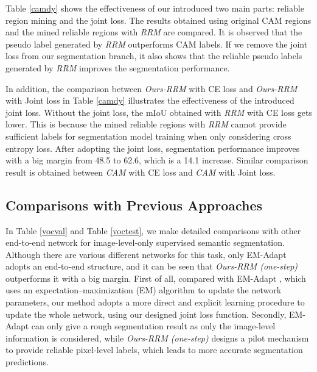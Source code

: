 \documentclass[letterpaper]{article} \usepackage{aaai20}  \usepackage{times}  \usepackage{helvet} \usepackage{courier}  \usepackage[hyphens]{url}  \usepackage{graphicx} \urlstyle{rm} \def\UrlFont{\rm}  \usepackage{graphicx}  \frenchspacing  \setlength{\pdfpagewidth}{8.5in}  \setlength{\pdfpageheight}{11in}
\begin{document}
 Table \ref{camdy} shows the effectiveness of our introduced two main parts: reliable region mining and the joint loss. The results obtained using original CAM regions and the mined reliable regions with \emph{RRM} are compared. It is observed that the pseudo label generated by \emph{RRM} outperforms CAM labels. If we remove the joint loss from our segmentation branch, it also shows that the reliable pseudo labels generated by \emph{RRM} improves the segmentation performance. 

In addition, the comparison between \emph{Ours-RRM} with CE loss and \emph{Ours-RRM} with Joint loss in Table \ref{camdy} illustrates the effectiveness of the introduced joint loss. Without the joint loss, the mIoU obtained with \emph{RRM} with CE loss gets lower. This is because the mined reliable regions with \emph{RRM} cannot provide sufficient labels for segmentation model training when only considering cross entropy loss. After adopting the joint loss, segmentation performance improves with a big margin from 48.5 to 62.6, which is a 14.1 increase. Similar comparison result is obtained between \emph{CAM} with CE loss and \emph{CAM} with Joint loss. 
 


\subsection{Comparisons with Previous Approaches}

In Table \ref{vocval} and Table \ref{voctest}, we make detailed comparisons with other end-to-end network for image-level-only supervised semantic segmentation. Although there are various different networks for this task, only EM-Adapt \cite{papandreou1502weakly} adopts an end-to-end structure, and it can be seen that \emph{Ours-RRM (one-step)} outperforms it with a big margin. First of all, compared with EM-Adapt \cite{papandreou1502weakly}, which uses an expectation–maximization (EM) algorithm to update the network parameters, our method adopts a more direct and explicit learning procedure to update the whole network, using our designed joint loss function. Secondly, EM-Adapt \cite{papandreou1502weakly} can only give a rough segmentation result as only the image-level information is considered, while \emph{Ours-RRM (one-step)} designs a pilot mechanism to provide reliable pixel-level labels, which leads to more accurate segmentation predictions.
\end{document}
